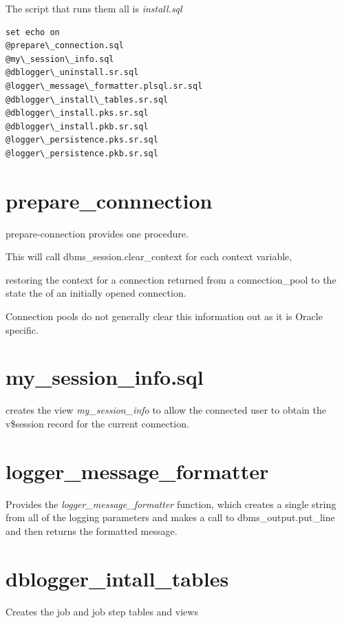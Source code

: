 \documentclass[letterpaper,10pt,english]{sphinxmanual}
\begin{document}
The script that runs them all is \emph{install.sql}

\begin{Verbatim}[commandchars=\\\{\}]
set echo on
@prepare\_connection.sql
@my\_session\_info.sql
@dblogger\_uninstall.sr.sql
@logger\_message\_formatter.plsql.sr.sql
@dblogger\_install\_tables.sr.sql
@dblogger\_install.pks.sr.sql
@dblogger\_install.pkb.sr.sql
@logger\_persistence.pks.sr.sql
@logger\_persistence.pkb.sr.sql
\end{Verbatim}


\section{prepare\_connnection}
\label{index:prepare-connnection}
\begin{DUlineblock}{0em}
\item[] prepare-connection provides one procedure.
\item[] This will call dbms\_session.clear\_context for each context variable,
\end{DUlineblock}

restoring the context for a connection returned from a connection\_pool
to the state the of an initially opened connection.

Connection pools do not generally clear this information out as it is
Oracle specific.


\section{my\_session\_info.sql}
\label{index:my-session-info-sql}
creates the view \emph{my\_session\_info} to allow the connected user to
obtain the v\$session record for the current connection.


\section{logger\_message\_formatter}
\label{index:logger-message-formatter}
Provides the \emph{logger\_message\_formatter} function, which creates a
single string from all of the logging parameters and makes a call to
dbms\_output.put\_line and then returns the formatted message.


\section{dblogger\_intall\_tables}
\label{index:dblogger-intall-tables}
Creates the job and job step tables and views
\end{document}

